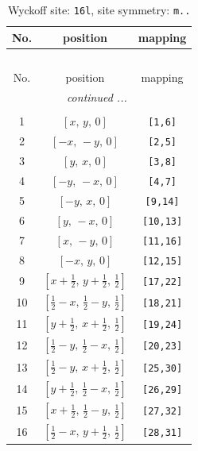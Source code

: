 \documentclass[fleqn,8pt]{jsarticle}
\begin{document}
\renewcommand{\arraystretch}{1.2}
\begin{longtable}{ccc}
\caption{Wyckoff site: {\tt 16l}, site symmetry: {\tt m..}}
 \\
 \hline \hline
No. & position & mapping \\ \hline \endfirsthead

\multicolumn{2}{l}{\tablename\ \thetable{}} \\
 \hline \hline
No. & position & mapping \\ \hline \endhead

 \hline \hline
\multicolumn{2}{r}{\footnotesize\it continued ...} \\ \endfoot

 \hline \hline
\multicolumn{2}{r}{} \\ \endlastfoot

1 & $\left[ x,\, y,\, 0 \right]$ & {\tt [1,6]} \\ \hline
2 & $\left[ - x,\, - y,\, 0 \right]$ & {\tt [2,5]} \\ \hline
3 & $\left[ y,\, x,\, 0 \right]$ & {\tt [3,8]} \\ \hline
4 & $\left[ - y,\, - x,\, 0 \right]$ & {\tt [4,7]} \\ \hline
5 & $\left[ - y,\, x,\, 0 \right]$ & {\tt [9,14]} \\ \hline
6 & $\left[ y,\, - x,\, 0 \right]$ & {\tt [10,13]} \\ \hline
7 & $\left[ x,\, - y,\, 0 \right]$ & {\tt [11,16]} \\ \hline
8 & $\left[ - x,\, y,\, 0 \right]$ & {\tt [12,15]} \\ \hline
9 & $\left[ x + \frac{1}{2},\, y + \frac{1}{2},\, \frac{1}{2} \right]$ & {\tt [17,22]} \\ \hline
10 & $\left[ \frac{1}{2} - x,\, \frac{1}{2} - y,\, \frac{1}{2} \right]$ & {\tt [18,21]} \\ \hline
11 & $\left[ y + \frac{1}{2},\, x + \frac{1}{2},\, \frac{1}{2} \right]$ & {\tt [19,24]} \\ \hline
12 & $\left[ \frac{1}{2} - y,\, \frac{1}{2} - x,\, \frac{1}{2} \right]$ & {\tt [20,23]} \\ \hline
13 & $\left[ \frac{1}{2} - y,\, x + \frac{1}{2},\, \frac{1}{2} \right]$ & {\tt [25,30]} \\ \hline
14 & $\left[ y + \frac{1}{2},\, \frac{1}{2} - x,\, \frac{1}{2} \right]$ & {\tt [26,29]} \\ \hline
15 & $\left[ x + \frac{1}{2},\, \frac{1}{2} - y,\, \frac{1}{2} \right]$ & {\tt [27,32]} \\ \hline
16 & $\left[ \frac{1}{2} - x,\, y + \frac{1}{2},\, \frac{1}{2} \right]$ & {\tt [28,31]} \\
\end{longtable}
\end{document}
